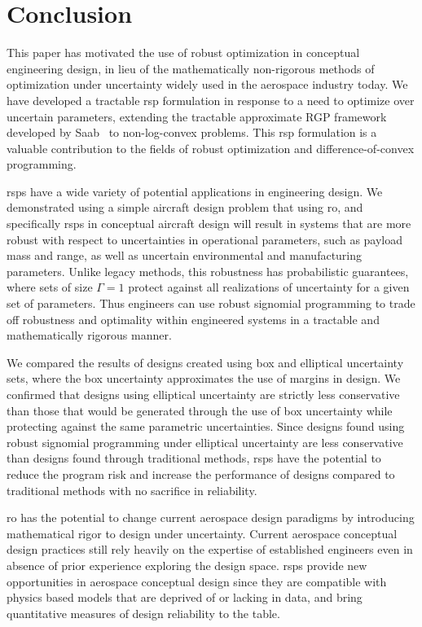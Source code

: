 \section{Conclusion}

This paper has motivated the use of robust optimization in conceptual engineering
design, in lieu of the mathematically non-rigorous methods of optimization under uncertainty
widely used in the aerospace industry today. We have developed a tractable \gls{rsp} formulation
in response to a need to optimize over uncertain parameters, extending
the tractable approximate RGP framework developed by Saab~\cite{Saab2018} to non-log-convex problems.
This \gls{rsp} formulation is a valuable contribution to the fields of robust
optimization and difference-of-convex programming.

\gls{rsp}s have a wide variety of potential applications in engineering design.
We demonstrated using a simple aircraft design problem
that using \gls{ro}, and specifically \gls{rsp}s in conceptual aircraft design will result in systems
that are more robust with respect to uncertainties in operational parameters,
such as payload mass and range, as well as uncertain environmental and manufacturing parameters.
Unlike legacy methods, this robustness has probabilistic guarantees, where sets of size $\Gamma=1$
protect against all realizations of uncertainty for a given set of parameters.
Thus engineers can use robust signomial programming to trade off
robustness and optimality within engineered systems in a tractable and mathematically rigorous manner.

We compared the results of designs created using box and elliptical uncertainty sets, where the
box uncertainty approximates the use of margins in design. We
confirmed that designs using elliptical uncertainty are strictly less conservative
than those that would be generated through the use of box uncertainty while protecting against the same
parametric uncertainties. Since designs found using robust signomial programming
under elliptical uncertainty are less conservative
than designs found through traditional methods, \gls{rsp}s have the potential to reduce
the program risk and increase the performance
of designs compared to traditional methods with no sacrifice in reliability.

\gls{ro} has the potential to change current aerospace design paradigms by introducing
mathematical rigor to design under uncertainty. Current aerospace
conceptual design practices still rely heavily on the expertise of established
engineers even in absence of prior experience exploring the design space.
\gls{rsp}s provide new opportunities in aerospace conceptual design
since they are compatible with physics based models
that are deprived of or lacking in data, and bring quantitative
measures of design reliability to the table.
